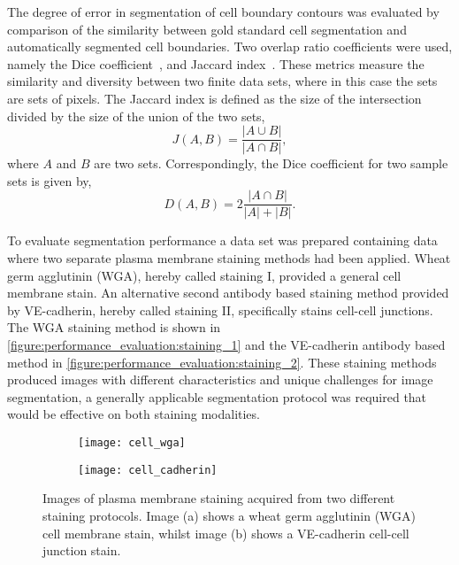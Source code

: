 The degree of error in segmentation of cell boundary contours was evaluated by comparison of the similarity between gold standard cell segmentation and automatically segmented cell boundaries. Two overlap ratio coefficients were used, namely the Dice coefficient~\cite{Dice1945}, and Jaccard index~\cite{Jaccard1912}. These metrics measure the similarity and diversity between two finite data sets, where in this case the sets are sets of pixels. The Jaccard index is defined as the size of the intersection divided by the size of the union of the two sets,
\begin{equation}
J(A,B) = \frac{|A\cup B|}{|A \cap B|} ,
\end{equation}
where $A$ and $B$ are two sets. Correspondingly, the Dice coefficient for two sample sets is given by,
\begin{equation}
D(A,B) = 2 \frac{|A\cap B|}{|A| + |B|}.
\end{equation}

To evaluate segmentation performance a data set was prepared containing data where two separate plasma membrane staining methods had been applied. Wheat germ agglutinin (WGA), hereby called staining I, provided a general cell membrane stain. An alternative second antibody based staining method provided by VE-cadherin, hereby called staining II, specifically stains cell-cell junctions. The WGA staining method is shown in \autoref{figure:performance_evaluation:staining_1} and the VE-cadherin antibody based method in \autoref{figure:performance_evaluation:staining_2}. These staining methods produced images with different characteristics and unique challenges for image segmentation, a generally applicable segmentation protocol was required that would be effective on both staining modalities.

\begin{figure}[htbp]\centering
	\begin{subfigure}[b]{0.49\linewidth}
		\centering
		\texttt{[image: cell\_wga]}
		\caption{}
		\label{figure:performance_evaluation:staining_1}
		\vspace{1ex}
	\end{subfigure}
	\begin{subfigure}[b]{0.49\linewidth}
		\centering
		\texttt{[image: cell\_cadherin]}
		\caption{}
		\label{figure:performance_evaluation:staining_2}
		\vspace{1ex}
	\end{subfigure}
\caption[Cell staining protocols]{Images of plasma membrane staining acquired from two different staining protocols. Image (a) shows a wheat germ agglutinin (WGA) cell membrane stain, whilst image (b) shows a VE-cadherin cell-cell junction stain.}
\label{figure:performance_evaluation:staining}
\end{figure}

